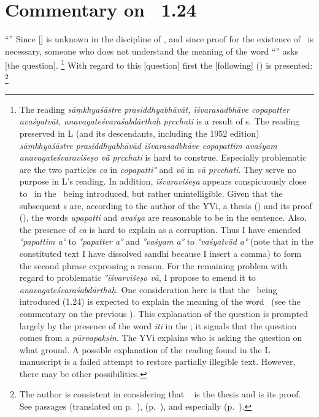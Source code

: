 \chapter{Commentary on \PYS\ 1.24}
\renewcommand{\rightmark}{\MakeUppercase{1.24]}}
\thispagestyle{plain}
\label{trl:on1.24}


``''  Since [\Isvara] is unknown in the discipline of \Samkhya, and since proof for the existence of \Isvara\ is necessary, someone who does not understand the meaning of the word ``\Isvara'' asks [the question].%
  \footnote{The reading \emph{sāṃkhyaśāstre prasiddhyabhāvāt, īśvarasadbhāve copapa\emph{tter avaśyatvāt, a}navagateśvara\emph{śabdārthaḥ} pṛcchati} is a result of s.  The reading preserved in L (and its descendants, including the 1952 edition) \emph{sāṃkhyaśāstre prasiddhyabhāvād īśvarasadbhāve copapattim avaśyam anavagateśvaraviśeṣo vā pṛcchati} is hard to construe.  Especially problematic are the two particles \emph{ca} in \emph{copapatti\/°} and \emph{vā\/} in \emph{vā pṛcchati}.  They serve no purpose in L's reading.  In addition, \emph{īśvaraviśeṣa} appears conspicuously close to \purusavisesa\ in the \sutra\ being introduced, but rather unintelligible. Given that the subsequent \sutra s are, according to the author of the YVi, a thesis () and its proof (), the words \emph{upapatti} and \emph{avaśya} are reasonable to be in the sentence.  Also, the presence of \emph{ca} is hard to explain as a corruption.  Thus I have emended \emph{°papattim a°} to \emph{°papatter a°} and \emph{°vaśyam a°} to \emph{°vaśyatvād a°} (note that in the constituted text I have dissolved sandhi because I insert a comma) to form the second phrase expressing a reason.  For the remaining problem with regard to problematic \emph{°īśvarviśeṣo vā}, I propose to emend it to \emph{anavagateśvaraśabdārthaḥ}.  One consideration here is that the \sutra\ being introduced (1.24) is expected to explain the meaning of the word \Isvara\ (see the commentary on the previous \sutra).  This explanation of the question is prompted largely by the presence of the word \emph{iti} in the \bhasya; it signals that the question comes from a \emph{pūrvapakṣin}. The YVi explains who is asking the question on what ground. A possible explanation of the reading found in the L manuscript is a failed attempt to restore partially illegible text. However, there may be other possibilities.}  %
With regard to this [question] first the [following]  (\pratijna) is presented:%
  \footnote{\label{NONTH}The author is consistent in considering that \sutra\  is the thesis and  is its proof.  See passages   (translated on p.~\pageref{TSMNI}), %
   (p.~\pageref{TTPR}), %
  and especially  (p.~\pageref{YTHPRTJ}).}%

